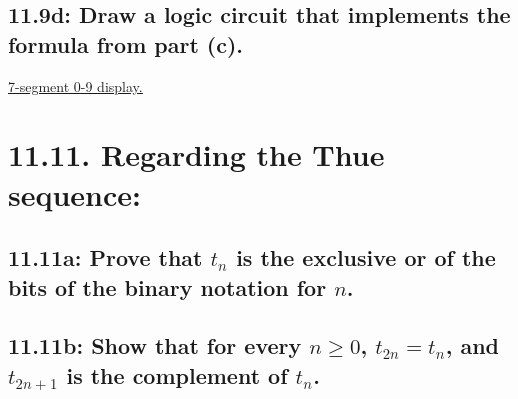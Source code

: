 \documentclass{article}
\begin{document}
\subsection*{11.9d: Draw a logic circuit that implements the formula from part (c).}
\textcolor{blue}{\underline{\href{http://tinyurl.com/yqdsyb2x}{7-segment 0-9 display.}}}
\section*{11.11. Regarding the Thue sequence:}
\subsection*{11.11a: Prove that $t_n$ is the exclusive or of the bits of the binary notation for $n$.}
\subsection*{11.11b: Show that for every $n\geq0$, $t_{2n}=t_n$, and $t_{2n+1}$ is the complement of $t_n$.}
\end{document}
